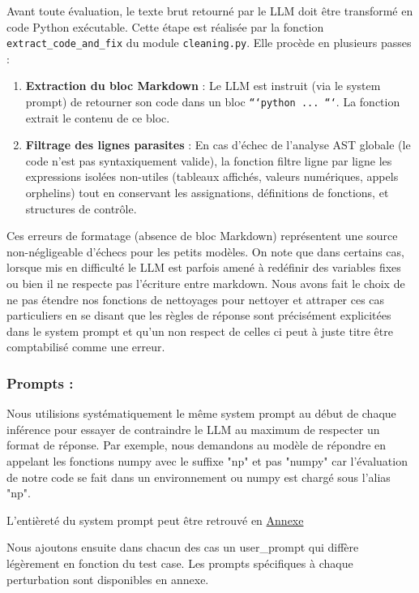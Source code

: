 \documentclass[11pt, a4paper]{article}
\begin{document}
Avant toute évaluation, le texte brut retourné par le LLM doit être transformé en code Python exécutable. Cette étape est réalisée par la fonction \texttt{extract\_code\_and\_fix} du module \texttt{cleaning.py}. Elle procède en plusieurs passes :

\begin{enumerate}
    \item \textbf{Extraction du bloc Markdown} : Le LLM est instruit (via le system prompt) de retourner son code dans un bloc \texttt{```python ... ```}. La fonction extrait le contenu de ce bloc.

    \item \textbf{Filtrage des lignes parasites} : En cas d'échec de l'analyse AST globale (le code n'est pas syntaxiquement valide), la fonction filtre ligne par ligne les expressions isolées non-utiles (tableaux affichés, valeurs numériques, appels orphelins) tout en conservant les assignations, définitions de fonctions, et structures de contrôle.
\end{enumerate}

Ces erreurs de formatage (absence de bloc Markdown) représentent une source non-négligeable d'échecs pour les petits modèles. On note que dans certains cas, lorsque mis en difficulté le LLM est parfois amené à redéfinir des variables fixes ou bien il ne respecte pas l'écriture entre markdown. Nous avons fait le choix de ne pas étendre nos fonctions de nettoyages pour nettoyer et attraper ces cas particuliers en se disant que les règles de réponse sont précisément explicitées dans le system prompt et qu'un non respect de celles ci peut à juste titre être comptabilisé comme une erreur.

\subsubsection{Prompts : } \label{sec:prompt}
Nous utilisions systématiquement le même system prompt au début de chaque inférence pour essayer de contraindre le LLM au maximum de respecter un format de réponse. Par exemple, nous demandons au modèle de répondre en appelant les fonctions numpy avec le suffixe "np" et pas "numpy" car l'évaluation de notre code se fait dans un environnement ou numpy est chargé sous l'alias "np". 

L'entièreté du system prompt peut être retrouvé en \hyperref[sec:annexe_prompt]{Annexe}

Nous ajoutons ensuite dans chacun des cas un user\_prompt qui diffère légèrement en fonction du test case. 
Les prompts spécifiques à chaque perturbation sont disponibles en annexe.
\end{document}
